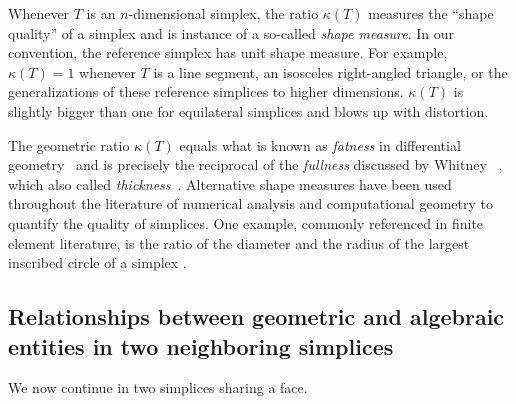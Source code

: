 \documentclass[10pt,letterpaper]{article}
\newcommand\cye[1]{%
  \protect\leavevmode
  \begingroup
    \color{red!35!yellow}%
    #1%
  \endgroup
}
\begin{document}
\begin{remark}
    Whenever $T$ is an $n$-dimensional simplex, the ratio $\kappa(T)$ measures the ``shape quality'' of a simplex and is instance of a so-called \emph{shape measure}.
    In our convention, the reference simplex has unit shape measure.
    For example, $\kappa(T)=1$ whenever $T$ is a line segment, an isosceles right-angled triangle, or the generalizations of these reference simplices to higher dimensions. $\kappa(T)$ is slightly bigger than one for equilateral simplices and blows up with distortion.

    The geometric ratio $\kappa(T)$ equals what is known as \emph{fatness} in differential geometry~\cite{cheeger1984curvature} and is precisely the reciprocal of the \emph{fullness} discussed by Whitney~\cite{whitney2012geometric}\cye{, which also called} \emph{thickness}~\cite{munkres2016elementary}.
    Alternative shape measures have been used throughout the literature of numerical analysis and computational geometry to quantify the quality of simplices.
    One example, commonly referenced in finite element literature, is the ratio of the diameter and the radius of the largest inscribed circle of a simplex\cye{.} 
\end{remark}


\subsection{\cye{Relationships between geometric and algebraic entities in two neighboring simplices}}

\cye{We now continue in two simplices sharing a face.}


\end{document}
